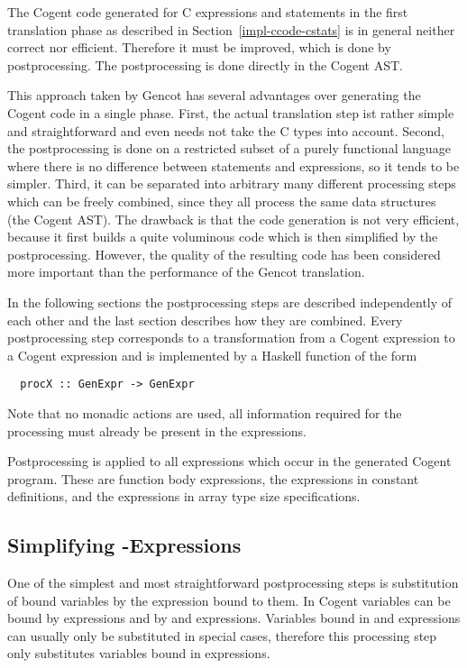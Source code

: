 The Cogent code generated for C expressions and statements in the first translation phase as described in 
Section~\ref{impl-ccode-cstats} is in general neither correct nor efficient. Therefore it must be improved, 
which is done by postprocessing. The postprocessing is done directly in the Cogent AST. 

This approach taken by Gencot has several advantages over generating the Cogent code in a single phase.
First, the actual translation step ist rather simple and straightforward and even needs not take the C types
into account. Second, the postprocessing is done on a restricted subset of a purely functional language where 
there is no difference between statements and expressions, so it tends to be simpler. Third, it can be separated
into arbitrary many different processing steps which can be freely combined, since they all process the same
data structures (the Cogent AST). The drawback is that the code generation is not very efficient, because it
first builds a quite voluminous code which is then simplified by the postprocessing. However, the quality 
of the resulting code has been considered more important than the performance of the Gencot translation.

In the following sections the postprocessing steps are described independently of each other and the last
section describes how they are combined. Every postprocessing step corresponds to a transformation from
a Cogent expression to a Cogent expression and is implemented by a Haskell function of the form
\begin{verbatim}
  procX :: GenExpr -> GenExpr
\end{verbatim}
Note that no monadic actions are used, all information required for the processing must already be present in the 
expressions.

Postprocessing is applied to all expressions which occur in the generated Cogent program. These are function 
body expressions, the expressions in constant definitions, and the expressions in array type size specifications.

\subsection{Simplifying -Expressions}
\label{imp-post-let}

One of the simplest and most straightforward postprocessing steps is substitution of bound variables by the
expression bound to them. In Cogent variables can be bound by  expressions and by  and 
expressions. Variables bound in  and  expressions can usually only be substituted in special cases, 
therefore this processing step only substitutes variables bound in  expressions. 


